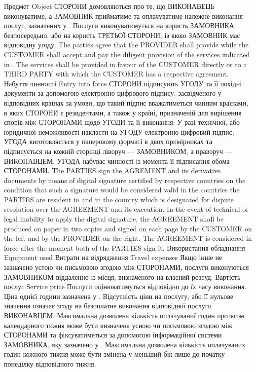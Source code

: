 \begin{Form}
\begin{paracol}{3}
        {}
      \clause
        {Предмет}
        {Object}
        {}
        {СТОРОНИ домовляються про те, що ВИКОНАВЕЦЬ виконуватиме, а ЗАМОВНИК прийматиме та оплачуватиме належне виконання послуг, зазначених у . Послуги виконуватимуться на користь ЗАМОВНИКА безпосередьно, або на користь ТРЕТЬОЇ СТОРОНИ, із якою ЗАМОВНИК має відповідну угоду.}
        {The parties agree that the PROVIDER shall provide while the CUSTOMER shall accept and pay the diligent provision of the services indicated in . The services shall be provided in favour of the CUSTOMER directly or to a THIRD PARTY with which the CUSTOMER has a respective agreement.}
        {}
      \clause
        {Набуття чинності}
        {Entry into force}
        {}
        {СТОРОНИ підписують УГОДУ та її похідні документи за допомогою електронно-цифрового підпису, засвідченого у відповідних країнах за умови, що такий підпис вважатиметься чинним країнами, в яких СТОРОНИ є резидентами, а також у країні, призначеній для вирішення спорів між СТОРОНАМИ щодо УГОДИ та її виконання. У разі технічної, або юридичної неможливості накласти на УГОДУ електронно-цифровий підпис, УГОДА виготовляється у паперовому форматі в двох примірниках та підписується на кожній сторінці ліворуч — ЗАМОВНИКОМ, а праворуч — ВИКОНАВЦЕМ. УГОДА набуває чинності із момента її підписання обома СТОРОНАМИ.}
        {The PARTIES sign the AGREMENT and its derivative documents by means of digital signature certified by respective countries on the condition that such a signature would be considered valid in the countries the PARTIES are resident in and in the country which is designated for dispute resolution over the AGREEMENT and its execution. In the event of technical or legal inability to apply the digital signature, the AGREEMENT shall be produced on paper in two copies and signed on each page by the CUSTOMER on the left and by the PROVIDER on the right. The AGREEMENT is considered in force after the moment both of the PARTIES sign it.}
        {}
      \clause
        {Використання обладнання}
        {Equipment used}
        {}
        {}
        {}
        {}
      \clause
        {Витрати на відрядження}
        {Travel expenses}
        {}
        {Якщо інше не зазначено устою чи письмовою згодою між СТОРОНАМИ, послуги виконуються ЗАМОВНИКОМ віддаленно із місця, визначеного на власний розсуд. }
        {}
        {}
      \clause
        {Вартість послуг}
        {Service price}
        {}
        {Послуги оцінюватимуться відповідно до їх часу виконання. Ціна однієї години зазначена у . Відсутність ціни на послугу, або її нульове значення означає згоду на безоплатне виконання відповідної послуги ВИКОНАВЦЕМ. Максимальна дозволена кількість оплачуваниї годин протягом календарного тижня може бути визначена усною чи письмовою згодою між СТОРОНАМИ та фіксуватиметься за допомогою інформаційної системи ЗАМОВНИКА, яку зазначено у . Максимальна дозволена кількість оплачуваних годин кожного тижня може бути змінена у меньший бік лише до початку понеділку відповідного тижня.}

\end{paracol}
\end{Form}
